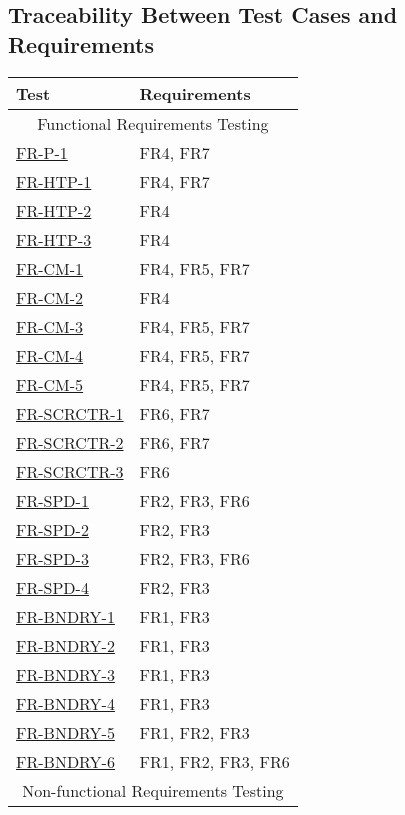\documentclass[12pt, titlepage]{article}
\begin{document}
\subsection{Traceability Between Test Cases and Requirements}
\label{trace}

\begin{table}[H]
\centering
\begin{tabular}{p{} p{}}
\toprule
\textbf{Test} & \textbf{Requirements}\\
\midrule
\multicolumn{2}{c}{Functional Requirements Testing} \\
\midrule
\hyperref[fr:p-1]{FR-P-1} & FR4, FR7\\ 
\hyperref[fr:htp-1]{FR-HTP-1} & FR4, FR7\\
\hyperref[fr:htp-2]{FR-HTP-2}  & FR4\\
\hyperref[fr:htp-3]{FR-HTP-3} & FR4\\
\hyperref[fr:cm-1]{FR-CM-1}  & FR4, FR5, FR7\\
\hyperref[fr:cm-2]{FR-CM-2}  & FR4\\
\hyperref[fr:cm-3]{FR-CM-3}  & FR4, FR5, FR7\\
\hyperref[fr:cm-4]{FR-CM-4} & FR4, FR5, FR7\\
\hyperref[fr:cm-5]{FR-CM-5}  & FR4, FR5, FR7\\
\hyperref[fr:scrctr-1]{FR-SCRCTR-1}  & FR6, FR7\\
\hyperref[fr:scrctr-2]{FR-SCRCTR-2} & FR6, FR7\\
\hyperref[fr:scrctr-3]{FR-SCRCTR-3} & FR6\\
\hyperref[fr:spd-1]{FR-SPD-1}  & FR2, FR3, FR6\\
\hyperref[fr:spd-2]{FR-SPD-2} & FR2, FR3\\
\hyperref[fr:spd-3]{FR-SPD-3} & FR2, FR3, FR6\\
\hyperref[fr:spd-4]{FR-SPD-4} & FR2, FR3\\
\hyperref[fr:bndry-1]{FR-BNDRY-1} & FR1, FR3\\
\hyperref[fr:bndry-2]{FR-BNDRY-2} & FR1, FR3\\
\hyperref[fr:bndry-3]{FR-BNDRY-3} & FR1, FR3\\
\hyperref[fr:bndry-4]{FR-BNDRY-4} & FR1, FR3\\
\hyperref[fr:bndry-5]{FR-BNDRY-5} & FR1, FR2, FR3\\
\hyperref[fr:bndry-6]{FR-BNDRY-6} & FR1, FR2, FR3, FR6\\
\midrule
\multicolumn{2}{c}{Non-functional Requirements Testing} \\

\end{tabular}
\end{table}
\end{document}

